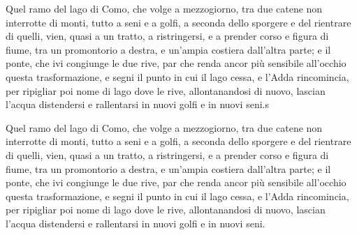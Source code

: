 \documentclass[11pt,a4paper]{book}
\begin{document}
\pausenumbering
\begin{pairs}
\begin{Leftside}
\resumenumbering
	\pstart Quel ramo del lago di Como, che volge a mezzogiorno, tra due catene non interrotte di monti, tutto a seni e a golfi, a seconda dello sporgere e del rientrare di quelli, vien, quasi a un tratto, a ristringersi, e a prender corso e figura di fiume, tra un promontorio a destra, e un’ampia costiera dall’altra parte; e il ponte, che ivi congiunge le due rive, par che renda ancor più sensibile all’occhio questa trasformazione, e segni il punto in cui il lago cessa, e l’Adda rincomincia, per ripigliar poi nome di lago dove le rive, allontanandosi di nuovo, lascian l’acqua distendersi e rallentarsi in nuovi golfi e in nuovi seni.s\pend
\pausenumbering
\end{Leftside}

\begin{Rightside}
\beginnumbering

	\pstart Quel ramo del lago di Como, che volge a mezzogiorno, tra due catene non interrotte di monti, tutto a seni e a golfi, a seconda dello sporgere e del rientrare di quelli, vien, quasi a un tratto, a ristringersi, e a prender corso e figura di fiume, tra un promontorio a destra, e un’ampia costiera dall’altra parte; e il ponte, che ivi congiunge le due rive, par che renda ancor più sensibile all’occhio questa trasformazione, e segni il punto in cui il lago cessa, e l’Adda rincomincia, per ripigliar poi nome di lago dove le rive, allontanandosi di nuovo, lascian l’acqua distendersi e rallentarsi in nuovi golfi e in nuovi seni.\pend
\pausenumbering
\end{Rightside}
\end{pairs}
\Columns

\resumenumbering
\end{document}
